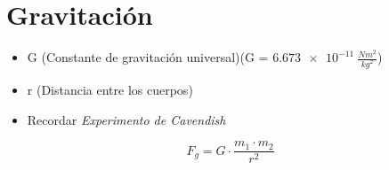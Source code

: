 \section{Gravitación}
    \begin{itemize}
        \item G (Constante de gravitación universal)(G = $\SI{6.673e-11}{\frac{Nm^2}{kg^2}}$)
        \item r (Distancia entre los cuerpos)
        \item Recordar \textit{Experimento de Cavendish}
    \end{itemize}
    \begin{equation}
        F_g = G \cdot \frac{m_1 \cdot m_2}{r^2}
    \end{equation}
    